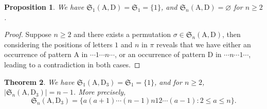 \documentclass[12pt,reqno]{article}
\numberwithin{equation}{section}
\theoremstyle{plain}
\newtheorem{theorem}{Theorem}[section]
\newtheorem{proposition}[theorem]{Proposition}
\theoremstyle{definition}
\def\fS{\mathfrak{S}}
\def\rA{\mathrm{A}}
\def\rD{\mathrm{D}}
\begin{document}
\begin{proposition}\label{thm:P1P2}
	We have $\fS_1(\rA,\rD)=\fS_1=\{1\}$, and $\fS_n(\rA,\rD)=\varnothing$ for $n\geq 2$.
\end{proposition}

\begin{proof}
	Suppose $n\geq 2$ and there exists a permutation $\sigma\in\fS_n(\rA,\rD)$, then considering the positions of letters $1$ and $n$ in $\pi$ reveals that we have either an occurrence of pattern $\rA$ in $\cdots 1\cdots n\cdots$, or an occurrence of pattern $\rD$ in $\cdots n\cdots 1\cdots$, leading to a contradiction in both cases.
\end{proof}

\begin{theorem}\label{thm:P1P4}
	We have $\fS_1(\rA,\rD_3)=\fS_1=\{1\}$, and for $n\geq 2$, $|\fS_n(\rA,\rD_3)|=n-1$. More precisely,
	$$\fS_n(\rA,\rD_3)=\{a(a+1)\cdots (n-1)n12\cdots (a-1): 2\le a\le n\}.$$ 
\end{theorem}
\end{document}
